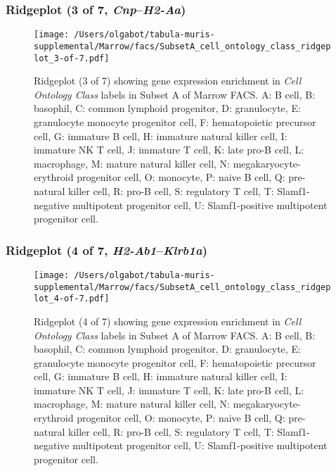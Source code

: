 \subsubsection{Ridgeplot (3 of 7, \emph{Cnp}--\emph{H2-Aa})}
\begin{figure}[h]
\centering
\texttt{[image: /Users/olgabot/tabula-muris-supplemental/Marrow/facs/SubsetA\_cell\_ontology\_class\_ridgeplot\_3-of-7.pdf]}

\caption{ Ridgeplot (3 of 7)  showing gene expression enrichment in \emph{Cell Ontology Class} labels in Subset A of Marrow FACS. A: B cell, B: basophil, C: common lymphoid progenitor, D: granulocyte, E: granulocyte monocyte progenitor cell, F: hematopoietic precursor cell, G: immature B cell, H: immature natural killer cell, I: immature NK T cell, J: immature T cell, K: late pro-B cell, L: macrophage, M: mature natural killer cell, N: megakaryocyte-erythroid progenitor cell, O: monocyte, P: naive B cell, Q: pre-natural killer cell, R: pro-B cell, S: regulatory T cell, T: Slamf1-negative multipotent progenitor cell, U: Slamf1-positive multipotent progenitor cell.}
\end{figure}


\clearpage

\subsubsection{Ridgeplot (4 of 7, \emph{H2-Ab1}--\emph{Klrb1a})}
\begin{figure}[h]
\centering
\texttt{[image: /Users/olgabot/tabula-muris-supplemental/Marrow/facs/SubsetA\_cell\_ontology\_class\_ridgeplot\_4-of-7.pdf]}

\caption{ Ridgeplot (4 of 7)  showing gene expression enrichment in \emph{Cell Ontology Class} labels in Subset A of Marrow FACS. A: B cell, B: basophil, C: common lymphoid progenitor, D: granulocyte, E: granulocyte monocyte progenitor cell, F: hematopoietic precursor cell, G: immature B cell, H: immature natural killer cell, I: immature NK T cell, J: immature T cell, K: late pro-B cell, L: macrophage, M: mature natural killer cell, N: megakaryocyte-erythroid progenitor cell, O: monocyte, P: naive B cell, Q: pre-natural killer cell, R: pro-B cell, S: regulatory T cell, T: Slamf1-negative multipotent progenitor cell, U: Slamf1-positive multipotent progenitor cell.}
\end{figure}


\clearpage

